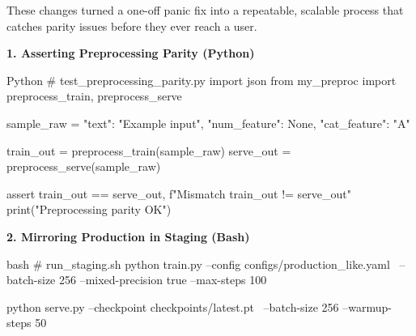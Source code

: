 \documentclass[11pt]{article}
\begin{document}
\vspace{0.1in}

These changes turned a one-off panic fix into a repeatable, scalable process that catches parity issues before they ever reach a user.

\vspace{0.15in}

\textbf{1. Asserting Preprocessing Parity (Python)}

\begin{codebox}{Python}
# test_preprocessing_parity.py
import json
from my_preproc import preprocess_train, preprocess_serve

sample_raw = {
    "text": "Example input",
    "num_feature": None,
    "cat_feature": "A"
}

train_out = preprocess_train(sample_raw)
serve_out = preprocess_serve(sample_raw)

assert train_out == serve_out, f"Mismatch {train_out} != {serve_out}"
print("Preprocessing parity OK")
\end{codebox}

\vspace{0.15in}

\textbf{2. Mirroring Production in Staging (Bash)}

\begin{codebox}{bash}
# run_staging.sh
python train.py --config configs/production_like.yaml \
    --batch-size 256 --mixed-precision true --max-steps 100

python serve.py --checkpoint checkpoints/latest.pt \
    --batch-size 256 --warmup-steps 50
\end{codebox}

\vfill
\newpage


\vspace*{0.35in}
\end{document}

